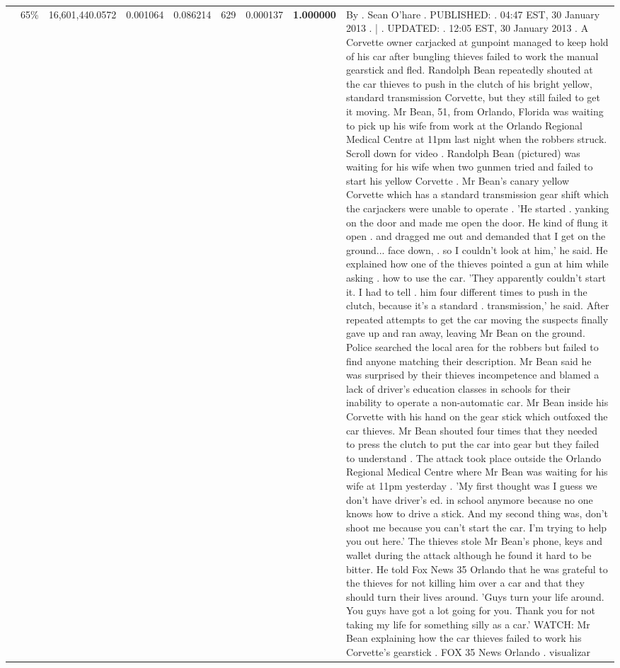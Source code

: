 \begin{table}[H]
\begin{tabular}{llrrrrrrl}
 & 65\% & 16,601,440.0572 & 0.001064 & 0.086214 & \color{red} 629 & 0.000137 & \bfseries \color{red} 1.000000 & By . Sean O'hare . PUBLISHED: . 04:47 EST, 30 January 2013 . | . UPDATED: . 12:05 EST, 30 January 2013 . A Corvette owner carjacked at gunpoint managed to keep hold of his car after bungling thieves failed to work the manual gearstick and fled. Randolph Bean repeatedly shouted at the car thieves to push in the clutch of his bright yellow, standard transmission Corvette, but they still failed to get it moving. Mr Bean, 51, from Orlando, Florida was waiting to pick up his wife from work at the Orlando Regional Medical Centre at 11pm last night when the robbers struck. Scroll down for video . Randolph Bean (pictured) was waiting for his wife when two gunmen tried and failed to start his yellow Corvette . Mr Bean's canary yellow Corvette which has a standard transmission gear shift which the carjackers were unable to operate . 'He started . yanking on the door and made me open the door. He kind of flung it open . and dragged me out and demanded that I get on the ground... face down, . so I couldn't look at him,' he said. He explained how one of the thieves pointed a gun at him while asking . how to use the car. 'They apparently couldn't start it. I had to tell . him four different times to push in the clutch, because it's a standard . transmission,' he said. After repeated attempts to get the car moving the suspects finally gave up and ran away, leaving Mr Bean on the ground. Police searched the local area for the robbers but failed to find anyone matching their description. Mr Bean said he was surprised by their thieves incompetence and blamed a lack of driver's education classes in schools for their inability to operate a non-automatic car. Mr Bean inside his Corvette with his hand on the gear stick which outfoxed the car thieves. Mr Bean shouted four times that they needed to press the clutch to put the car into gear but they failed to understand . The attack took place outside the Orlando Regional Medical Centre where Mr Bean was waiting for his wife at 11pm yesterday . 'My first thought was I guess we don't have driver's ed. in school anymore because no one knows how to drive a stick. And my second thing was, don't shoot me because you can't start the car. I'm trying to help you out here.' The thieves stole Mr Bean's phone, keys and wallet during the attack although he found it hard to be bitter. He told Fox News 35 Orlando that he was grateful to the thieves for not killing him over a car and that they should turn their lives around. 'Guys turn your life around. You guys have got a lot going for you. Thank you for not taking my life for something silly as a car.' WATCH: Mr Bean explaining how the car thieves failed to work his Corvette's gearstick . FOX 35 News Orlando . visualizar \\

\end{tabular}
\end{table}

